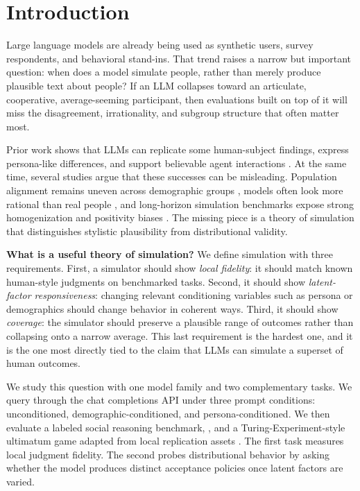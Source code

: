 \section{Introduction}
\label{sec:introduction}

Large language models are already being used as synthetic users, survey respondents, and behavioral stand-ins. That trend raises a narrow but important question: when does a model simulate people, rather than merely produce plausible text about people? If an LLM collapses toward an articulate, cooperative, average-seeming participant, then evaluations built on top of it will miss the disagreement, irrationality, and subgroup structure that often matter most.

Prior work shows that LLMs can replicate some human-subject findings, express persona-like differences, and support believable agent interactions \cite{park2023generative,aher2023using,xie2024trust,sorokovikova2024bigfive}. At the same time, several studies argue that these successes can be misleading. Population alignment remains uneven across demographic groups \cite{santurkar2023opinions}, models often look more rational than real people \cite{liu2025rational}, and long-horizon simulation benchmarks expose strong homogenization and positivity biases \cite{chen2026omnibehavior}. The missing piece is a theory of simulation that distinguishes stylistic plausibility from distributional validity.

{\bf What is a useful theory of simulation?} We define simulation with three requirements. First, a simulator should show {\it local fidelity}: it should match known human-style judgments on benchmarked tasks. Second, it should show {\it latent-factor responsiveness}: changing relevant conditioning variables such as persona or demographics should change behavior in coherent ways. Third, it should show {\it coverage}: the simulator should preserve a plausible range of outcomes rather than collapsing onto a narrow average. This last requirement is the hardest one, and it is the one most directly tied to the claim that LLMs can simulate a superset of human outcomes.

We study this question with one model family and two complementary tasks. We query \gptfourone through the chat completions API under three prompt conditions: unconditioned, demographic-conditioned, and persona-conditioned. We then evaluate a labeled social reasoning benchmark, \socialiqa, and a Turing-Experiment-style ultimatum game adapted from local replication assets \cite{aher2023using}. The first task measures local judgment fidelity. The second probes distributional behavior by asking whether the model produces distinct acceptance policies once latent factors are varied.


